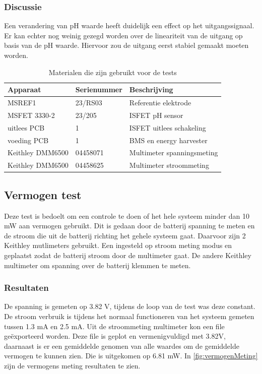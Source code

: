 \subsubsection{Discussie}
Een verandering van pH waarde heeft duidelijk een effect op het uitgangssignaal. Er kan echter nog weinig gezegd worden over de lineariteit van de uitgang op basis van de pH waarde. Hiervoor zou de uitgang eerst stabiel gemaakt moeten worden.


\begin{table}[ht]
    \centering
    \begin{tabular}{l|l|l}
        Apparaat         & Serienummer & Beschrijving \\
        \hline
        MSREF1           & 23/RS03     & Referentie elektrode       \\
        MSFET 3330-2     & 23/205      & ISFET pH sensor            \\
        uitlees PCB      & 1           & ISFET uitlees schakeling   \\
        voeding PCB      & 1           & BMS en energy harvester    \\    
        Keithley DMM6500 & 04458071    & Multimeter spanningsmeting \\
        Keithley DMM6500 & 04458625    & Multimeter stroommeting    \\
        \hline
    \end{tabular}
    \caption{Materialen die zijn gebruikt voor de tests}
    \label{tab:testMaterialen2}
\end{table}


\subsection{Vermogen test}
Deze test is bedoelt om een controle te doen of het hele systeem minder dan 10 mW aan vermogen gebruikt. Dit is gedaan door de batterij spanning te meten en de stroom die uit de batterij richting het gehele systeem gaat. Daarvoor zijn 2 Keithley mutlimeters gebruikt. Een ingesteld op stroom meting modus en geplaatst zodat de batterij stroom door de multimeter gaat. De andere Keithley multimeter om spanning over de batterij klemmen te meten. 

\subsubsection{Resultaten}
De spanning is gemeten op 3.82 V, tijdens de loop van de test was deze constant. De stroom verbruik is tijdens het normaal functioneren van het systeem gemeten tussen 1.3 mA en 2.5 mA. Uit de stroommeting multimeter kon een file geëxporteerd worden. Deze file is geplot en vermenigvuldigd met 3.82V, daarnaast is er een gemiddelde genomen van alle waardes om de gemiddelde vermogen te kunnen zien. Die is uitgekomen op 6.81 mW. In \cref{fig:vermogenMeting} zijn de vermogens meting resultaten te zien.

